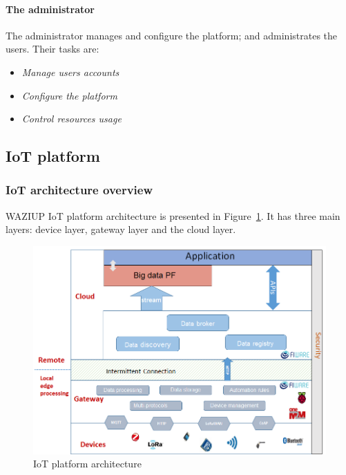 \paragraph{The administrator}
The administrator manages and configure the platform; and administrates the users. Their tasks are:
\begin{itemize}
	\item \emph{Manage users accounts}
	\item \emph{Configure the platform}
	\item \emph{Control resources usage}
\end{itemize}

\subsection{IoT platform}

\subsubsection{IoT architecture overview}

WAZIUP IoT platform architecture is presented in Figure~\ref{fig:iotarchi}.
It has three main layers: device layer, gateway layer and the cloud layer.

\begin{figure}[h]
\centering
\includegraphics[width=\textwidth]{figs/iotarchi.png}
\caption{IoT platform architecture}
\label{fig:iotarchi}
\end{figure}

